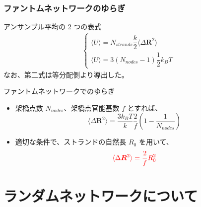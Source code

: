 \documentclass[aspectratio=169,11pt, dvipdfmx]{beamer}
\begin{document}
\begin{frame}
	\frametitle{ファントムネットワークのゆらぎ}
		\begin{block}{アンサンブル平均の 2 つの表式}
			\scriptsize
			\begin{align*}
				\begin{cases}
					\langle U \rangle = N_{strands} \dfrac{k}{2} \langle \Delta \bm{R}^2 \rangle \\
					\langle U \rangle = 3(N_{nodes}-1) \dfrac{1}{2} k_B T
				\end{cases}
			\end{align*}
			\normalsize
			なお、第二式は等分配側より導出した。
		\end{block}
		\begin{exampleblock}{ファントムネットワークでのゆらぎ}
			\begin{itemize}
				\item 架橋点数 $N_{nodes}$、架橋点官能基数 $f$ とすれば、
					\scriptsize
					\begin{equation*}
					\langle \Delta \bm{R}^2 \rangle = \dfrac{3k_B T}{k} \dfrac{2}{f} \left( 1-\dfrac{1}{N_{nodes}} \right)
					\end{equation*}
					\normalsize
				\item 適切な条件で、ストランドの自然長 $R_0$ を用いて、
					\scriptsize
					\begin{equation*}
					\color{red}
					\langle \Delta \bm{R}^2 \rangle = \dfrac{2}{f} R_0^2
					\end{equation*}
			\end{itemize}
		\end{exampleblock}
\end{frame}


\section{ランダムネットワークについて}
\end{document}

